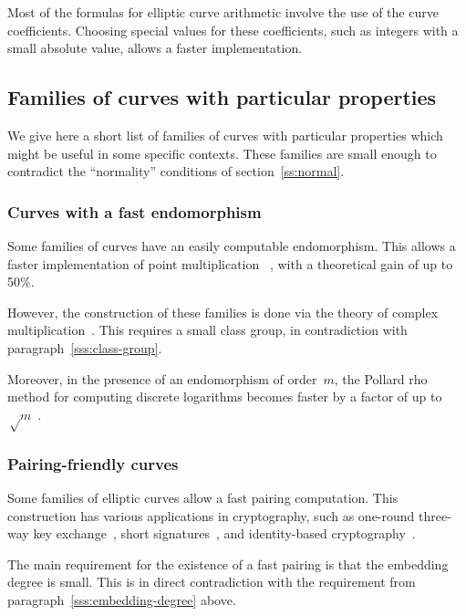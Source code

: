\documentclass[twocolumn,letterpaper,10pt]{article}
\begin{document}
Most of the formulas for elliptic curve arithmetic
involve the use of the curve coefficients.
Choosing special values for these coefficients,
such as integers with a small absolute value,
allows a faster implementation.

\subsection{Families of curves with particular properties}
\label{ss:particular}

We give here a short list of families of curves
with particular properties which might be useful in some specific contexts.
These families are small enough
to contradict the ``normality'' conditions of section~\ref{ss:normal}.

\subsubsection{Curves with a fast endomorphism}

Some families of curves have an easily computable endomorphism.
This allows a faster implementation of point multiplication%
~\cite{crypto2001glv,joc2011gls}, with a theoretical gain of up to 50\%.

However, the construction of these families
is done via the theory of complex multiplication~\cite{asia2013smith}.
This requires a small class group,
in contradiction with paragraph~\ref{sss:class-group}.

Moreover, in the presence of an endomorphism of order~$m$,
the Pollard rho method for computing discrete logarithms
becomes faster by a factor of up to~$√m$~\cite{asia1999dgm,moc2000glv}.

\subsubsection{Pairing-friendly curves}
\label{sss:pairing}

Some families of elliptic curves allow a fast pairing computation.
This construction has various applications in cryptography,
such as one-round three-way key exchange~\cite{jc2004joux},
short signatures~\cite{jc2004bls},
and identity-based cryptography~\cite{crypto2001bf,el2002paterson}.

The main requirement for the existence of a fast pairing
is that the embedding degree is small.
This is in direct contradiction with
the requirement from paragraph~\ref{sss:embedding-degree} above.
\end{document}
